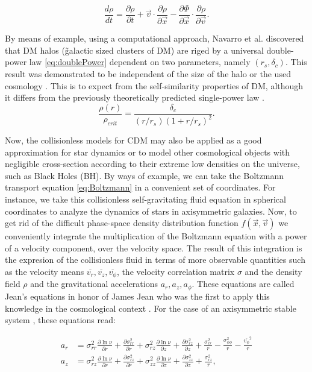 \begin{equation}
\frac{d\rho}{dt} = \frac{\partial \rho}{\partial t} +\vec{v}\cdot\frac{\partial\rho}{\partial \vec{x}}
-\frac{\partial \Phi}{\partial \vec{x}}\cdot\frac{\partial\rho}{\partial \vec{v}}.
\label{eq:Boltzmann}
\end{equation}

   
By means of example, using a computational approach, Navarro et al. discovered that DM halos (\~ galactic sized clusters of DM) are riged by a universal double-power law \eqref{eq:doublePower} dependent on two parameters, namely $(r_s,\delta_c)$. This result was demonstrated to be independent of the size of the halo or the used cosmology \cite{Navarro PowerLaw}. This is to expect from the self-similarity properties of DM, although it differs from the previously theoretically predicted single-power law  \cite{White-Zaritsky}.\\

\begin{equation}
\frac{\rho(r)}{\rho_{crit}} = \frac{\delta_c}{(r/r_s)(1+r/r_s)^2}.
\label{eq:doublePower}
\end{equation}

Now, the collisionless models for CDM may also be applied as a good approximation for star dynamics or to model other cosmological objects with negligible cross-section according to their extreme low densities on the universe, such as Black Holes (BH). By ways of example, we can take the Boltzmann transport equation \eqref{eq:Boltzmann} in a convenient set of coordinates. For instance, we take this collisionless self-gravitating fluid equation in spherical coordinates to analyze the dynamics of stars in axisymmetric galaxies. Now, to get rid of the difficult phase-space density distribution function $f(\vec{x},\vec{v})$ we conveniently integrate the multiplication of the Boltzmann equation with a power of a velocity component, over the velocity space. The result of this integration is the expresion of the collisionless fluid in terms of more observable quantities such as the velocity means $\overline{v_r},\overline{v_z},\overline{v_\phi}$, the velocity correlation matrix $\sigma$ and the density field $\rho$ and the gravitational accelerations $a_r,a_z,a_\phi$. These equations are called Jean's equations in honor of James Jean who was the first to apply this knowledge in the cosmological context \cite{Jeans}. For the case of an axisymmetric stable system \cite{Loebman}, these equations read:  

\begin{align}
a_r & = \sigma^2_{rr} \frac{\partial \ln \nu}{\partial r} + \frac{\partial \sigma^2_{rr} }{\partial r} + \sigma^2_{rz} \frac{\partial \ln \nu}{\partial z} + \frac{\partial \sigma^2_{rz} }{\partial z} +  \frac{\sigma^2_{rr}}{r}-\frac{\sigma^2_{\phi\phi}}{r}-\frac{\overline{v_\phi}^2}{r}\\
a_z & =  \sigma^2_{rz} \frac{\partial \ln \nu}{\partial r} + \frac{\partial \sigma^2_{rz} }{\partial r} + \sigma^2_{zz}\frac{\partial \ln \nu}{\partial z} + \frac{\partial \sigma^2_{zz} }{\partial z} +  \frac{\sigma^2_{rz}}{r},
\end{align}

